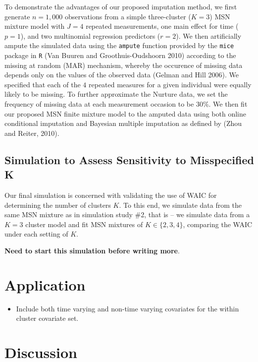 \documentclass[useAMS,referee]{biom}
\begin{document}
To demonstrate the advantages of our proposed imputation method, we first generate $n = 1,000$ observations from a simple three-cluster ($K = 3$) MSN mixture model with $J = 4$ repeated measurements, one main effect for time ($p = 1$), and two multinomial regression predictors ($r = 2$). We then artificially ampute the simulated data using the \texttt{ampute} function provided by the \texttt{mice} package in \texttt{R} (Van Buuren and Groothuis-Oudshoorn 2010) according to the missing at random (MAR) mechanism, whereby the occurence of missing data depends only on the values of the observed data (Gelman and Hill 2006). We specified that each of the $4$ repeated measures for a given individual were equally likely to be missing.  To further approximate the Nurture data, we set the frequency of missing data at each measurement occasion to be 30\%. We then fit our proposed MSN finite mixture model to the amputed data using both online conditional imputation and Bayesian multiple imputation as defined by (Zhou and Reiter, 2010).



\subsection{Simulation to Assess Sensitivity to Misspecified K}

Our final simulation is concerned with validating the use of WAIC for determining the number of clusters $K$. To this end, we simulate data from the same MSN mixture as in simulation study \#2, that is -- we simulate data from a $K = 3$ cluster model and fit MSN mixtures of $K \in \{2,3,4\}$, comparing the WAIC under each setting of $K$.

\textbf{Need to start this simulation before writing more}.

\newpage

\section{Application}
\label{s:app}

\begin{itemize}

\item Include both time varying and non-time varying covariates for the within cluster covariate set. 

\end{itemize}

\newpage

\section{Discussion}
\label{s:discuss}
\end{document}
